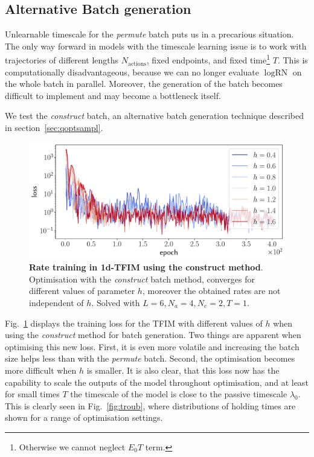 \subsection{Alternative Batch generation}
Unlearnable timescale for the \emph{permute} batch puts us in a precarious situation. The only way forward in models with the timescale learning issue is to work with trajectories of different lengths $N_{\text{actions}}$, fixed endpoints, and fixed time\footnote{Otherwise we cannot neglect $E_0T$ term.} $T$. This is computationally disadvantageous, because we can no longer evaluate $\log \text{RN}$ on the whole batch in parallel. Moreover, the generation of the batch becomes difficult to implement and may become a bottleneck itself. 

We test the \emph{construct} batch, an alternative batch generation technique described in section~\ref{sec:qoptsampl}. 
\begin{figure}[h]
	\centering
	\includegraphics[width=\linewidth]{Chapter5/Figs/Vector/constr-g-loss}
	\caption[Rate training in 1d-TFIM using the \emph{construct} method]{\textbf{Rate training in 1d-TFIM using the construct method}. Optimisation with the \emph{construct} batch method, converges for different values of parameter $h$, moreover the obtained rates are not independent of $h$. Solved with $L=6, N_a=4, N_e=2, T=1$.}
	\label{fig:constr-g-loss}
\end{figure}
Fig.~\ref{fig:constr-g-loss} displays the training loss for the TFIM with different values of $h$ when using the \emph{construct} method for batch generation. Two things are apparent when optimising this new loss. First, it is even more volatile and increasing the batch size helps less than with the \emph{permute} batch. Second, the optimisation becomes more difficult when $h$ is smaller. It is also clear, that this loss now has the capability to scale the outputs of the model throughout optimisation, and at least for small times $T$ the timescale of the model is close to the passive timescale $\lambda_0$. This is clearly seen in Fig.~\ref{fig:troub}, where distributions of holding times are shown for a range of optimisation settings. 
